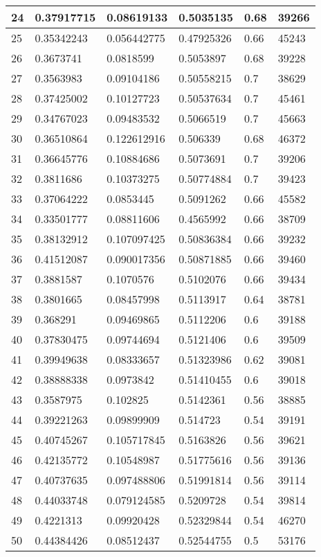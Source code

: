 \begin{longtable}{|l|l|l|l|l|l|}
24 & 0.37917715 & 0.08619133 & 0.5035135 & 0.68 & 39266 \\ \hline 
25 & 0.35342243 & 0.056442775 & 0.47925326 & 0.66 & 45243 \\ \hline 
26 & 0.3673741 & 0.0818599 & 0.5053897 & 0.68 & 39228 \\ \hline 
27 & 0.3563983 & 0.09104186 & 0.50558215 & 0.7 & 38629 \\ \hline 
28 & 0.37425002 & 0.10127723 & 0.50537634 & 0.7 & 45461 \\ \hline 
29 & 0.34767023 & 0.09483532 & 0.5066519 & 0.7 & 45663 \\ \hline 
30 & 0.36510864 & 0.122612916 & 0.506339 & 0.68 & 46372 \\ \hline 
31 & 0.36645776 & 0.10884686 & 0.5073691 & 0.7 & 39206 \\ \hline 
32 & 0.3811686 & 0.10373275 & 0.50774884 & 0.7 & 39423 \\ \hline 
33 & 0.37064222 & 0.0853445 & 0.5091262 & 0.66 & 45582 \\ \hline 
34 & 0.33501777 & 0.08811606 & 0.4565992 & 0.66 & 38709 \\ \hline 
35 & 0.38132912 & 0.107097425 & 0.50836384 & 0.66 & 39232 \\ \hline 
36 & 0.41512087 & 0.090017356 & 0.50871885 & 0.66 & 39460 \\ \hline 
37 & 0.3881587 & 0.1070576 & 0.5102076 & 0.66 & 39434 \\ \hline 
38 & 0.3801665 & 0.08457998 & 0.5113917 & 0.64 & 38781 \\ \hline 
39 & 0.368291 & 0.09469865 & 0.5112206 & 0.6 & 39188 \\ \hline 
40 & 0.37830475 & 0.09744694 & 0.5121406 & 0.6 & 39509 \\ \hline 
41 & 0.39949638 & 0.08333657 & 0.51323986 & 0.62 & 39081 \\ \hline 
42 & 0.38888338 & 0.0973842 & 0.51410455 & 0.6 & 39018 \\ \hline 
43 & 0.3587975 & 0.102825 & 0.5142361 & 0.56 & 38885 \\ \hline 
44 & 0.39221263 & 0.09899909 & 0.514723 & 0.54 & 39191 \\ \hline 
45 & 0.40745267 & 0.105717845 & 0.5163826 & 0.56 & 39621 \\ \hline 
46 & 0.42135772 & 0.10548987 & 0.51775616 & 0.56 & 39136 \\ \hline 
47 & 0.40737635 & 0.097488806 & 0.51991814 & 0.56 & 39114 \\ \hline 
48 & 0.44033748 & 0.079124585 & 0.5209728 & 0.54 & 39814 \\ \hline 
49 & 0.4221313 & 0.09920428 & 0.52329844 & 0.54 & 46270 \\ \hline 
50 & 0.44384426 & 0.08512437 & 0.52544755 & 0.5 & 53176 \\ \hline 
\end{longtable}